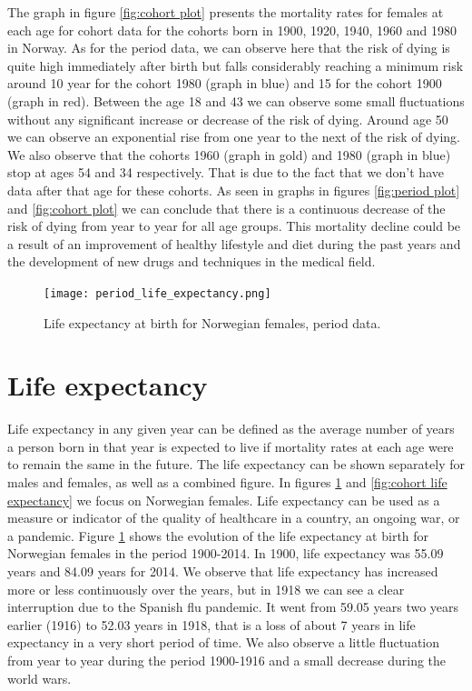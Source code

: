 The graph in figure \ref{fig:cohort plot} presents the mortality rates for females at each age for cohort data for the cohorts born in 1900, 1920, 1940, 1960 and 1980 in Norway.
As for the period data, we can observe here that the risk of dying is quite high immediately after birth but falls considerably reaching a minimum risk around 10 year for the cohort 1980 (graph in blue) and 15 for the cohort 1900 (graph in red). 
Between the age 18 and 43 we can observe some small fluctuations without any significant increase or decrease of the risk of dying. 
Around age 50 we can observe an exponential rise from one year to the next of the risk of dying. 
We also observe that the cohorts 1960 (graph in gold) and 1980 (graph in blue) stop at ages 54 and 34 respectively. 
That is due to the fact that we don't have data after that age for these cohorts.
As seen in graphs in figures \ref{fig:period plot} and \ref{fig:cohort plot} we can conclude that there is a continuous decrease of the risk of dying from year to year for all age groups. This mortality decline could be a result of an improvement of healthy lifestyle and diet during the past years and the development of new drugs and techniques in the medical field.




            \begin{figure}[tbh]
             \centering
              \texttt{[image: period\_life\_expectancy.png]}
              \caption{Life expectancy at birth for Norwegian females, period data.}
              \label{fig:period life expectancy}
            \end{figure}

\section{Life expectancy}


Life expectancy in any given year can be defined as the average number of years a person born in that year is expected to live if mortality rates at each age were to remain the same in the future. 
The life expectancy can be shown separately for males and females, as well as a combined figure. 
In figures \ref{fig:period life expectancy} and \ref{fig:cohort life expectancy} we focus on Norwegian females.
Life expectancy can be used as a measure or indicator of the quality of healthcare in a country, an ongoing war, or a pandemic.
Figure \ref{fig:period life expectancy} shows the evolution of the life expectancy at birth for Norwegian females in the period 1900-2014.
In 1900, life expectancy was 55.09 years and 84.09 years for 2014.
We observe that life expectancy has increased more or less continuously over the years, but  in 1918 we can see a clear interruption due to the Spanish flu pandemic. 
It went from 59.05 years two years earlier (1916) to 52.03 years in 1918, that is a loss of about 7 years in life expectancy in a very short period of time.
We also observe a little fluctuation from year to year during the period 1900-1916 and a small decrease during the world wars.



